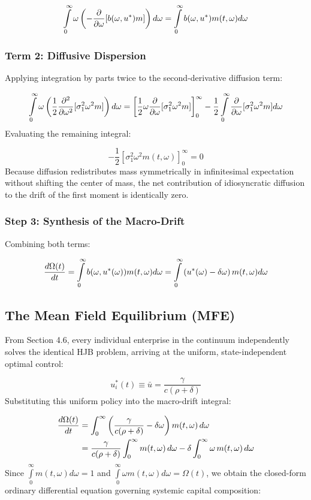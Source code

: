 \documentclass[11pt,letterpaper]{report}
\newcommand{\fitmath}[1]{\begingroup\setbox0=\hbox{$\displaystyle #1$}\ifdim\wd0>\linewidth\resizebox{\linewidth}{!}{$\displaystyle #1$}\else\displaystyle #1\fi\endgroup}
\begin{document}
\[\fitmath{\int\limits_{0}^{\infty }\omega \left({-\frac{\partial }{\partial \omega }[b(\omega ,{u}^{*})m]}\right)d\omega =\int\limits_{0}^{\infty }b(\omega ,{u}^{*})m(t,\omega )d\omega}\]
\subsubsection{Term 2: Diffusive Dispersion}
Applying integration by parts twice to the second-derivative diffusion term:

\[\fitmath{\int\limits_{0}^{\infty }\omega \left({\frac{1}{2}\frac{{\partial }^{2}}{\partial {\omega }^{2}}[{\sigma }_{1}^{2}{\omega }^{2}m]}\right)d\omega ={\left[{\frac{1}{2}\omega \frac{\partial }{\partial \omega }[{\sigma }_{1}^{2}{\omega }^{2}m]}\right]}_{0}^{\infty }-\frac{1}{2}\int\limits_{0}^{\infty }\frac{\partial }{\partial \omega }[{\sigma }_{1}^{2}{\omega }^{2}m]d\omega}\]
Evaluating the remaining integral:

\[
-\frac{1}{2}{\left[{{\sigma }_{1}^{2}{\omega }^{2}m(t,\omega )}\right]}_{0}^{\infty }=0
\]
Because diffusion redistributes mass symmetrically in infinitesimal expectation without shifting the center of mass, the net contribution of idiosyncratic diffusion to the drift of the first moment is identically zero.

\subsubsection{Step 3: Synthesis of the Macro-Drift}
Combining both terms:

\[\fitmath{\frac{d\Omega (t)}{dt}=\int\limits_{0}^{\infty }b(\omega ,{u}^{*}(\omega ))m(t,\omega )d\omega =\int\limits_{0}^{\infty }\left({{u}^{*}(\omega )-\delta \omega }\right)m(t,\omega )d\omega}\]
\subsection{The Mean Field Equilibrium (MFE)}
From Section 4.6, every individual enterprise in the continuum independently solves the identical HJB problem, arriving at the uniform, state-independent optimal control:

\[
{u}_{i}^{*}(t)\equiv \bar{u}=\frac{\gamma }{c(\rho +\delta )}
\]
Substituting this uniform policy into the macro-drift integral:

\[\fitmath{\begin{aligned} \frac{d\Omega(t)}{dt} &= \int_0^\infty \left( \frac{\gamma}{c(\rho + \delta)} - \delta \omega \right) m(t, \omega) \, d\omega \\ &= \frac{\gamma}{c(\rho + \delta)} \int_0^\infty m(t, \omega) \, d\omega - \delta \int_0^\infty \omega \, m(t, \omega) \, d\omega \end{aligned}}\]
Since $\int\limits_{0}^{\infty }m(t,\omega )d\omega =1$ and $\int\limits_{0}^{\infty }\omega m(t,\omega )d\omega =\Omega (t)$, we obtain the closed-form ordinary differential equation governing systemic capital composition:
\end{document}
